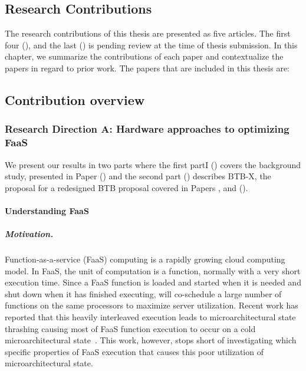 \documentclass[../main.tex]{subfiles}
\begin{document}
\ifx\chapincluded\undefined
  \begin{refsection}
 \fi

 \chapter{Research Contributions}
\label{chap:rcontrib}

The research contributions of this thesis are presented as five articles. The first four (), and the last () is pending review at the time of thesis submission. In this chapter, we summarize the contributions of each paper and contextualize the papers in regard to prior work. The papers that are included in this thesis are:


\section{Contribution overview}

\subsection{Research Direction A: Hardware approaches to optimizing FaaS}
We present our results in two parts where the first partI
() covers the
background study, presented in Paper  () and
the second part () describes BTB-X, the proposal for a
redesigned BTB proposal covered in Papers
,  and  ().

\subsubsection{Understanding FaaS}
\label{subsub:understanding}
\paragraph{Motivation.} Function-as-a-service (FaaS) computing is a rapidly growing cloud computing model. In FaaS, the unit of computation is a function, normally with a very short execution time. Since a FaaS function is loaded and started when it is needed and shut down when it has finished executing, will co-schedule a large number of functions on the same processors to maximize server utilization. Recent work has reported that this heavily interleaved execution leads to microarchitectural state thrashing causing most of FaaS function execution to occur on a cold microarchitectural state~\cite{shahrad19_archit_implic_funct_servic_comput,lukewarm_serverless}. This work, however, stops short of investigating which specific properties of FaaS execution that causes this poor utilization of microarchitectural state.


\end{refsection}
\end{document}
